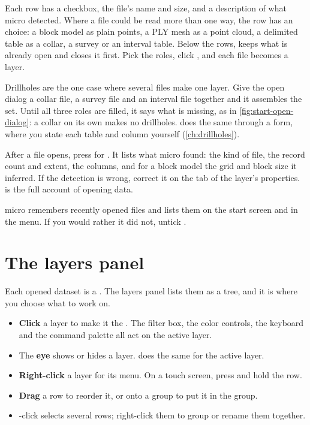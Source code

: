 Each row has a checkbox, the file's name and size, and a description of what micro detected. Where a file could be read more than one way, the row has an  choice: a block model as plain points, a PLY mesh as a point cloud, a delimited table as a collar, a survey or an interval table. Below the rows,  keeps what is already open and  closes it first. Pick the roles, click , and each file becomes a layer.

Drillholes are the one case where several files make one layer. Give the open dialog a collar file, a survey file and an interval file together and it assembles the set. Until all three roles are filled, it says what is missing, as in \cref{fig:start-open-dialog}: a collar on its own makes no drillholes.  does the same through a form, where you state each table and column yourself (\cref{ch:drillholes}).

After a file opens, press  for . It lists what micro found: the kind of file, the record count and extent, the columns, and for a block model the grid and block size it inferred. If the detection is wrong, correct it on the  tab of the layer's properties.  is the full account of opening data.

\begin{tip}
micro remembers recently opened files and lists them on the start screen and in the  menu. If you would rather it did not, untick .
\end{tip}

\section{The layers panel}\label{sec:start-layers}
Each opened dataset is a . The layers panel lists them as a tree, and it is where you choose what to work on.


\begin{itemize}
\item \textbf{Click} a layer to make it the . The filter box, the color controls, the keyboard and the command palette all act on the active layer.
\item The \textbf{eye} shows or hides a layer.  does the same for the active layer.
\item \textbf{Right-click} a layer for its menu. On a touch screen, press and hold the row.
\item \textbf{Drag} a row to reorder it, or onto a group to put it in the group.
\item {}-click selects several rows; right-click them to group or rename them together.
\end{itemize}

